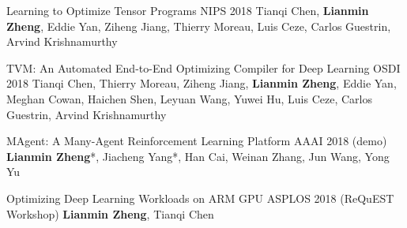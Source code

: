 

\begin{cventries}

  \cventry
	{}
	{Learning to Optimize Tensor Programs} %
	{NIPS 2018} %
	{} %
	{Tianqi Chen, \textbf{Lianmin Zheng}, Eddie Yan, Ziheng Jiang, Thierry Moreau, Luis Ceze, Carlos Guestrin, Arvind Krishnamurthy}

  \cventry
    {}
    {TVM: An Automated End-to-End Optimizing Compiler for Deep Learning} %
    {OSDI 2018} %
    {} %
    {Tianqi Chen, Thierry Moreau, Ziheng Jiang, \textbf{Lianmin Zheng}, Eddie Yan, Meghan Cowan, Haichen Shen, Leyuan Wang, Yuwei Hu, Luis Ceze, Carlos Guestrin, Arvind Krishnamurthy}

  \cventry
	{}
	{MAgent: A Many-Agent Reinforcement Learning Platform} %
	{AAAI 2018 (demo)} %
	{} %
	{\textbf{Lianmin Zheng}*, Jiacheng Yang*, Han Cai, Weinan Zhang, Jun Wang, Yong Yu}

  \cventry
	{}
	{Optimizing Deep Learning Workloads on ARM GPU} %
	{ASPLOS 2018 (ReQuEST Workshop)} %
	{} %
	{\textbf{Lianmin Zheng}, Tianqi Chen}

\end{cventries}

